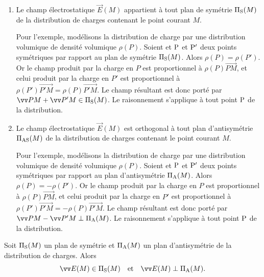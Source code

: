 \documentclass[12pt,fancy]{cours}
\begin{document}
\begin{enumerate}
\item Le champ électrostatique $\Vec{E}(M)$ appartient à tout plan de symétrie $\Pi_{\rm S}(M)$ de la distribution de charges contenant le point courant $M$.

\begin{preuve}
  Pour l'exemple, modélisons la distribution de charge par une distribution volumique de densité volumique $\rho(P)$. Soient et $\rm P$ et $\rm P'$ deux points symétriques par rapport au plan de symétrie $\Pi_{\rm S}(M)$. Alors $\rho(P)=\rho(P')$. Or le champ produit par la charge en $P$ est proportionnel à $\rho(P) \Vec{PM}$, et celui produit par la charge en $P'$ est proportionnel à $\rho(P') \Vec{P'M} = \rho(P) \Vec{P'M}$. Le champ résultant est donc porté par $\Vec{PM} + \Vec{P'M} \in \Pi_{\rm S}(M)$. Le raisonnement s'applique à tout point $\rm P$ de la distribution.
\end{preuve}
\item Le champ électrostatique $\Vec{E}(M)$ est orthogonal à tout plan d'antisymétrie $\Pi_{\rm AS}(M)$ de la distribution de charges contenant le point courant $M$.

 \begin{preuve}
  Pour l'exemple, modélisons la distribution de charge par une distribution volumique de densité volumique $\rho(P)$. Soient et $\rm P$ et $\rm P'$ deux points symétriques par rapport au plan d'antisymétrie $\Pi_{\rm A}(M)$. Alors $\rho(P)=-\rho(P')$. Or le champ produit par la charge en $P$ est proportionnel à $\rho(P) \Vec{PM}$, et celui produit par la charge en $P'$ est proportionnel à $\rho(P') \Vec{P'M} = -\rho(P) \Vec{P'M}$. Le champ résultant est donc porté par $\Vec{PM} - \Vec{P'M} \perp \Pi_{\rm A}(M)$. Le raisonnement s'applique à tout point $\rm P$ de la distribution.
\end{preuve}
\end{enumerate}
\begin{prop}\label{prop:}
  Soit $\Pi_{\rm S}(M)$ un plan de symétrie et $\Pi_{\rm A}(M)$ un plan d'antisymétrie de la distribution de charges. Alors
  \begin{equation*}
    \Vec{E}(M) \in \Pi_{\rm S}(M) \quad\text{et}\quad \Vec{E}(M) \perp \Pi_{\rm A}(M).
  \end{equation*}

\end{prop}
\end{document}
